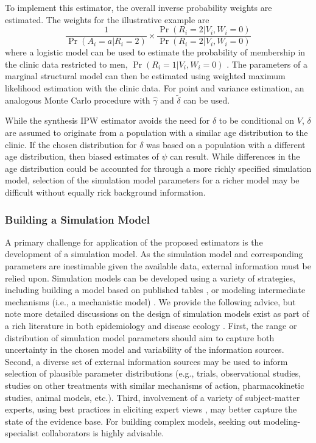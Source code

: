 \documentclass[]{article}
\begin{document}
To implement this estimator, the overall inverse probability weights are estimated. The weights for the illustrative example are
\[\frac{1}{\Pr(A_i=a | R_i = 2)} \times \frac{\Pr(R_i = 2 | V_i, W_i = 0)}{\Pr(R_i = 2 | V_i, W_i = 0)}\]
where a logistic model can be used to estimate the probability of membership in the clinic data restricted to men, $\Pr(R_i = 1 | V_i, W_i = 0)$ \cite{westreich_transportability_2017}. The parameters of a marginal structural model can then be estimated using weighted maximum likelihood estimation with the clinic data. For point and variance estimation, an analogous Monte Carlo procedure with $\hat{\gamma}$ and $\tilde{\delta}$ can be used.

While the synthesis IPW estimator avoids the need for $\delta$ to be conditional on $V$, $\delta$ are assumed to originate from a population with a similar age distribution to the clinic. If the chosen distribution for $\delta$ was based on a population with a different age distribution, then biased estimates of $\psi$ can result. While differences in the age distribution could be accounted for through a more richly specified simulation model, selection of the simulation model parameters for a richer model may be difficult without equally rick background information.

\subsubsection*{Building a Simulation Model}

A primary challenge for application of the proposed estimators is the development of a simulation model. As the simulation model and corresponding parameters are inestimable given the available data, external information must be relied upon. Simulation models can be developed using a variety of strategies, including building a model based on published tables \cite{krijkamp_microsimulation_2018, caglayan_microsimulation_2018, grummon_health_2019}, or modeling intermediate mechanisms (i.e., a mechanistic model) \cite{lessler_mechanistic_2016, kirkeby_practical_2021}. We provide the following advice, but note more detailed discussions on the design of simulation models exist as part of a rich literature in both epidemiology and disease ecology \cite{krijkamp_microsimulation_2018, roberts_conceptualizing_2012, railsback_agent-based_2011, slayton_modeling_2020}. First, the range or distribution of simulation model parameters should aim to capture both uncertainty in the chosen model and variability of the information sources. Second, a diverse set of external information sources may be used to inform selection of plausible parameter distributions (e.g., trials, observational studies, studies on other treatments with similar mechanisms of action, pharmacokinetic studies, animal models, etc.). Third, involvement of a variety of subject-matter experts, using best practices in eliciting expert views \cite{bojke_good_2021, ohagan_expert_2019}, may better capture the state of the evidence base. For building complex models, seeking out modeling-specialist collaborators is highly advisable.
\end{document}
